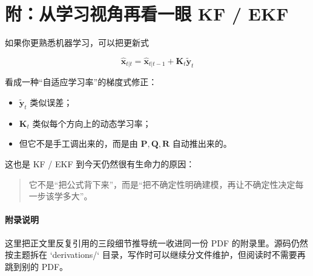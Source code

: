 \documentclass[12pt,a4paper]{ctexart}
\begin{document}
\section{附：从学习视角再看一眼 KF / EKF}

如果你更熟悉机器学习，可以把更新式

\[
\hat{\bm{x}}_{t|t}
= \hat{\bm{x}}_{t|t-1} + \bm{K}_t\tilde{\bm{y}}_t
\]

看成一种“自适应学习率”的梯度式修正：

\begin{itemize}
  \item \(\tilde{\bm{y}}_t\) 类似误差；
  \item \(\bm{K}_t\) 类似每个方向上的动态学习率；
  \item 但它不是手工调出来的，而是由 \(\bm{P}, \bm{Q}, \bm{R}\) 自动推出来的。
\end{itemize}

这也是 KF / EKF 到今天仍然很有生命力的原因：

\begin{quote}
它不是“把公式背下来”，而是“把不确定性明确建模，再让不确定性决定每一步该学多大”。
\end{quote}

\clearpage
\appendix

\paragraph{附录说明}
这里把正文里反复引用的三段细节推导统一收进同一份 PDF 的附录里。源码仍然按主题拆在 `derivations/` 目录，写作时可以继续分文件维护，但阅读时不需要再跳到别的 PDF。

\clearpage


\clearpage


\clearpage

\end{document}
